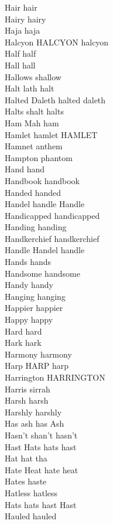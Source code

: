 Hair hair\\
Hairy hairy\\
Haja haja\\
Halcyon HALCYON halcyon\\
Half half\\
Hall hall\\
Hallows shallow\\
Halt lath halt\\
Halted Daleth halted daleth\\
Halts shalt halts\\
Ham Mah ham\\
Hamlet hamlet HAMLET\\
Hamnet anthem\\
Hampton phantom\\
Hand hand\\
Handbook handbook\\
Handed handed\\
Handel handle Handle\\
Handicapped handicapped\\
Handing handing\\
Handkerchief handkerchief\\
Handle Handel handle\\
Hands hands\\
Handsome handsome\\
Handy handy\\
Hanging hanging\\
Happier happier\\
Happy happy\\
Hard hard\\
Hark hark\\
Harmony harmony\\
Harp HARP harp\\
Harrington HARRINGTON\\
Harris sirrah\\
Harsh harsh\\
Harshly harshly\\
Has ash has Ash\\
Hasn't shan't hasn't\\
Hast Hats hats hast\\
Hat hat tha\\
Hate Heat hate heat\\
Hates haste\\
Hatless hatless\\
Hats hats hast Hast\\
Hauled hauled\\
